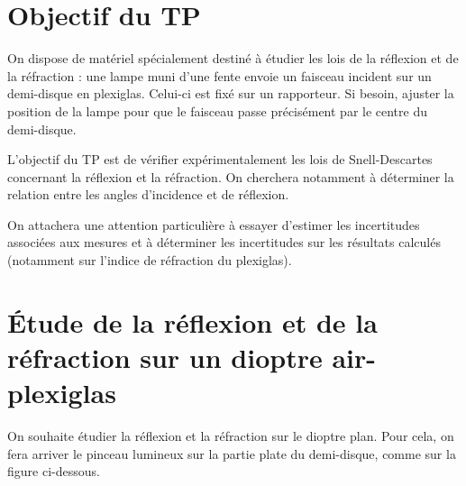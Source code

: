 \documentclass[a4paper]{tp}
\begin{document}
\section{Objectif du TP}

On dispose de matériel spécialement destiné à étudier les lois de la réflexion et de la réfraction : une lampe muni d'une fente envoie un faisceau incident sur un demi-disque en plexiglas. Celui-ci est fixé sur un rapporteur. Si besoin, ajuster la position de la lampe pour que le faisceau passe précisément par le centre du demi-disque.

L'objectif du TP est de vérifier expérimentalement les lois de Snell-Descartes concernant la réflexion et la réfraction. On cherchera notamment à déterminer la relation entre les angles d'incidence et de réflexion.

On attachera une attention particulière à essayer d'estimer les incertitudes associées aux mesures et à déterminer les incertitudes sur les résultats calculés (notamment sur l'indice de réfraction du plexiglas).


\section{\'Etude de la réflexion et de la réfraction sur un dioptre  air-plexiglas} 

On souhaite étudier la réflexion et la réfraction sur le dioptre plan. Pour cela, on fera arriver le pinceau lumineux sur la partie plate du demi-disque, comme sur la figure ci-dessous.
\end{document}
